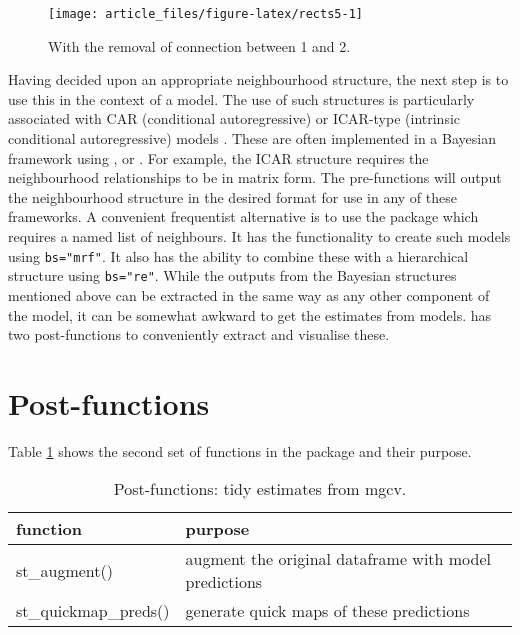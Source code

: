\begin{figure}

{\centering \texttt{[image: article\_files/figure-latex/rects5-1]} 

}

\caption{With the removal of connection between 1 and 2. }\label{fig:rects5}
\end{figure}

Having decided upon an appropriate neighbourhood structure, the next step is to use this in the context of a model. The use of such structures is particularly associated with CAR (conditional autoregressive) or ICAR-type (intrinsic conditional autoregressive) models \citep{besag}.
These are often implemented in a Bayesian framework using
,  or . For example, the  ICAR structure requires the neighbourhood relationships to be in matrix form. The pre-functions will output the
neighbourhood structure in the desired format for use in any of these
frameworks. A convenient frequentist alternative is to use the
 package which requires a named list of neighbours. It has the functionality to create such models
using \texttt{bs="mrf"}. It also has the ability to combine these with a
hierarchical structure using \texttt{bs="re"}. While the outputs from the
Bayesian structures mentioned above can be extracted in the same way as
any other component of the model, it can be somewhat awkward to get the
estimates from  models.  has two post-functions to conveniently extract and visualise these.

\section{Post-functions}\label{post-functions}

Table \ref{tab:postfunc-latex} shows the second set of functions in the package and their purpose.

\begin{table}
\centering
\caption{\label{tab:postfunc-latex}Post-functions: tidy estimates from mgcv.}
\centering
\fontsize{9}{11}\selectfont
\begin{tabular}[t]{l|l}
\hline
\textbf{function} & \textbf{purpose}\\
\hline
st\_augment() & augment the original dataframe with model predictions\\
\hline
st\_quickmap\_preds() & generate quick maps of these predictions\\
\hline
\end{tabular}
\end{table}

